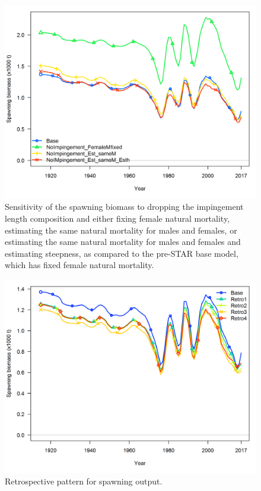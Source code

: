 \documentclass[12pt,]{article}
\begin{document}
\begin{figure}[htbp]
\centering
\includegraphics{Figures/sensitivity2_spawnbio.png}
\caption{Sensitivity of the spawning biomass to dropping the impingement
length composition and either fixing female natural mortality,
estimating the same natural mortality for males and females, or
estimating the same natural mortality for males and females and
estimating steepness, as compared to the pre-STAR base model, which has
fixed female natural mortality. \label{fig:sensitivity2_spawnbio}}
\end{figure}

\FloatBarrier

\begin{figure}[htbp]
\centering
\includegraphics{Figures/retro_spawnb.png}
\caption{Retrospective pattern for spawning output.
\label{fig:retro_spawnb}}
\end{figure}
\end{document}
